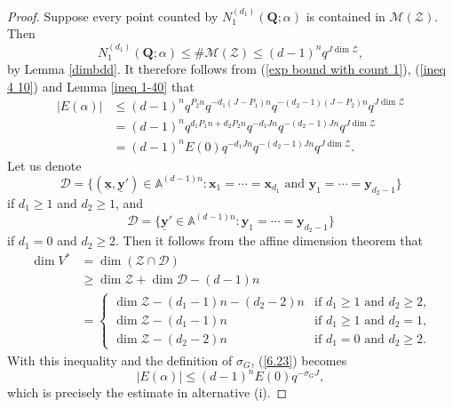 \documentclass[12pt, reqno]{amsart}
\numberwithin{equation}{section}
\newcommand{\0}{\mathbf{0}}
\renewcommand{\leq}{\leqslant}
\renewcommand{\geq}{\geqslant}
\renewcommand{\=}{\equiv}
\newcommand{\1}{\mathbf{1}}
\theoremstyle{definition}
\begin{document}
\begin{proof}
Suppose every point counted by
$N_1^{(d_1)}(\mathbf Q; \alpha)$ is contained in $\mathcal{M}(\mathcal{Z})$. Then 
\begin{equation}
\label{ineq 4 10}
N_1^{(d_1)}(\mathbf Q; \alpha)
\leq
\# \mathcal{M}(\mathcal{Z})
\leq (d-1)^n q^{J \dim \mathcal{Z}} ,
\end{equation}
by  Lemma \ref{dimbdd}. It therefore follows from (\ref{exp bound with count 1}),
(\ref{ineq 4 10}) 
and Lemma \ref{ineq 1-40} that
\begin{equation}\begin{split}
\label{6.23}
| E (\alpha)|
&\leq  (d-1)^n q^{ P_2 n}
q^{- d_1 (J - P_1)  n} q^{- (d_2 - 1) (J- P_2) n } q^{J \dim \mathcal{Z}}
\\
&=
(d-1)^n  q^{d_1  P_1  n +  d_2  P_2 n } q^{- d_1 J   n} q^{- (d_2 - 1) J  n } q^{J \dim \mathcal{Z}}
\\
&=
(d-1)^n  E(0)  q^{- d_1 J   n} q^{- (d_2 - 1) J  n } q^{J \dim \mathcal{Z}}.
\end{split}\end{equation}
Let us denote
$$
\mathcal{D} = \{  (\underline{\mathbf{x}}, \underline{\mathbf{y}}') \in \mathbb{A}^{(d - 1 )n }:  \mathbf{x}_1 = \cdots = \mathbf{x}_{d_1} \text{ and }
\mathbf{y}_1 = \cdots = \mathbf{y}_{d_2-1} \}
$$
if $d_1 \geq 1$ and $d_2 \geq 1$, and
$$
\mathcal{D} = \{  \underline{\mathbf{y}}' \in \mathbb{A}^{(d - 1 )n }:  \mathbf{y}_1 = \cdots = \mathbf{y}_{d_2 - 1} \}
$$
if $d_1 = 0$ and $d_2 \geq 2$. Then it follows from the affine dimension theorem that
\begin{align*}
\dim V^{*} &= \dim ( \mathcal{Z} \cap \mathcal{D} )
\\
&\geq  \dim \mathcal{Z}
+ \dim \mathcal{D} - (d - 1) n
\\
&=
\begin{cases}
\dim \mathcal{Z}  -  (d_1 - 1) n -   (d_2 - 2) n  & \mbox{if $d_1 \geq 1$ and $d_2 \geq 2$,}  \\
\dim \mathcal{Z}  -  (d_1 - 1) n     & \mbox{if $d_1 \geq 1$ and $d_2 = 1$,}  \\
\dim \mathcal{Z}  -  (d_2 - 2) n    & \mbox{if $d_1 = 0$ and $d_2 \geq 2$.}
\end{cases}
\end{align*}
With this inequality and the definition of $\sigma_G$, (\ref{6.23}) becomes
$$
| E (\alpha)|
\leq
(d-1)^{n} E(0) q^{- \sigma_G J },
$$
which is precisely the estimate in alternative (i).


\end{proof}
\end{document}

